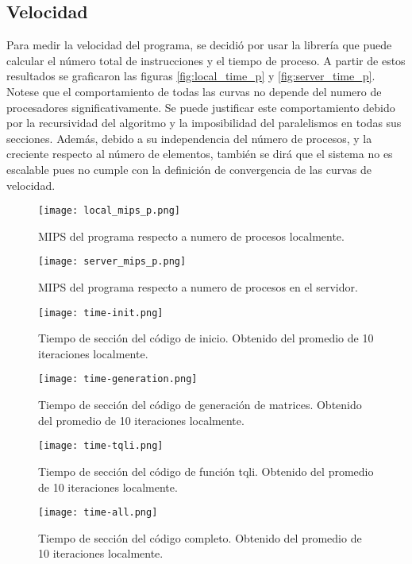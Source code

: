 \subsection{Velocidad}
Para medir la velocidad del programa, se decidió por usar la librería  que puede calcular el número total de instrucciones y el tiempo de proceso. A partir de estos resultados se graficaron las figuras \ref{fig:local_time_p} y \ref{fig:server_time_p}. Notese que el comportamiento de todas las curvas no depende del numero de procesadores significativamente. Se puede justificar este comportamiento debido por la recursividad del algoritmo y la imposibilidad del paralelismos en todas sus secciones. Además, debido a su independencia del número de procesos, y la creciente respecto al número de elementos, también se dirá que el sistema no es escalable pues no cumple con la definición de convergencia de las curvas de velocidad.





\begin{figure}
	\centering
	\texttt{[image: local\_mips\_p.png]}
	\caption{MIPS del programa respecto a numero de procesos localmente.}
	\label{fig:local_mips_p}
\end{figure}



\begin{figure}
	\centering
	\texttt{[image: server\_mips\_p.png]}
	\caption{MIPS del programa respecto a numero de procesos en el servidor.}
	\label{fig:server_mips_p}
\end{figure}

\begin{figure}
	\centering
	\texttt{[image: time-init.png]}
	\caption{Tiempo de sección del código de inicio. Obtenido del promedio de 10 iteraciones localmente.}
	\label{fig:server_mips_p}
\end{figure}

\begin{figure}
	\centering
	\texttt{[image: time-generation.png]}
	\caption{Tiempo de sección del código de generación de matrices. Obtenido del promedio de 10 iteraciones localmente.}
	\label{fig:server_mips_p}
\end{figure}

\begin{figure}
	\centering
	\texttt{[image: time-tqli.png]}
	\caption{Tiempo de sección del código de función tqli. Obtenido del promedio de 10 iteraciones localmente.}
	\label{fig:server_mips_p}
\end{figure}

\begin{figure}
	\centering
	\texttt{[image: time-all.png]}
	\caption{Tiempo de sección del código completo. Obtenido del promedio de 10 iteraciones localmente.}
	\label{fig:server_mips_p}
\end{figure}